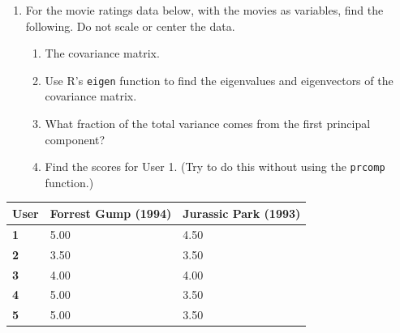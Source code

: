 \documentclass[
]{book}
\providecommand{\tightlist}{%
  \setlength{\itemsep}{0pt}\setlength{\parskip}{0pt}}
\theoremstyle{definition}
\theoremstyle{definition}
\theoremstyle{definition}
\theoremstyle{definition}
\theoremstyle{remark}
\begin{document}
\begin{enumerate}
\def\labelenumi{\arabic{enumi}.}
\setcounter{enumi}{21}
\tightlist
\item
  For the movie ratings data below, with the movies as variables, find the following. Do not scale or center the data.

  \begin{enumerate}
  \def\labelenumii{\alph{enumii}.}
  \tightlist
  \item
    The covariance matrix.
  \item
    Use R's \texttt{eigen} function to find the eigenvalues and eigenvectors of the covariance matrix.
  \item
    What fraction of the total variance comes from the first principal component?
  \item
    Find the scores for User 1. (Try to do this without using the \texttt{prcomp} function.)
  \end{enumerate}
\end{enumerate}

\begin{longtable}[]{@{}lll@{}}
\toprule\noalign{}
User & Forrest Gump (1994) & Jurassic Park (1993) \\
\midrule\noalign{}
\endhead
\bottomrule\noalign{}
\endlastfoot
\textbf{1} & 5.00 & 4.50 \\
\textbf{2} & 3.50 & 3.50 \\
\textbf{3} & 4.00 & 4.00 \\
\textbf{4} & 5.00 & 3.50 \\
\textbf{5} & 5.00 & 3.50 \\
\end{longtable}
\end{document}
